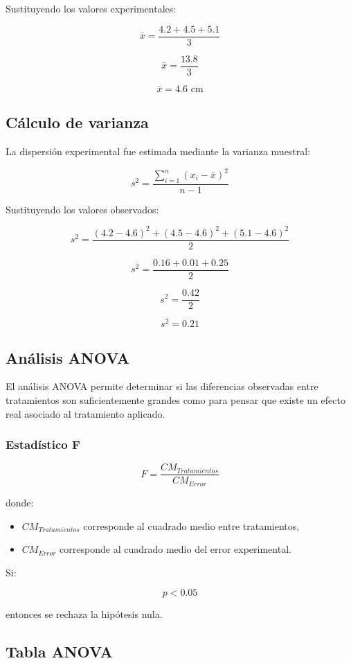 Sustituyendo los valores experimentales:

\[
\bar{x}=\frac{4.2+4.5+5.1}{3}
\]

\[
\bar{x}=\frac{13.8}{3}
\]

\[
\bar{x}=4.6\text{ cm}
\]

\subsection{Cálculo de varianza}

La dispersión experimental fue estimada mediante la varianza muestral:

\[
s^2=\frac{\sum_{i=1}^{n}(x_i-\bar{x})^2}{n-1}
\]

Sustituyendo los valores observados:

\[
s^2=\frac{
(4.2-4.6)^2+
(4.5-4.6)^2+
(5.1-4.6)^2
}{2}
\]

\[
s^2=
\frac{
0.16+0.01+0.25
}{2}
\]

\[
s^2=
\frac{0.42}{2}
\]

\[
s^2=0.21
\]

\subsection{Análisis ANOVA}

El análisis ANOVA permite determinar si las diferencias observadas entre tratamientos son suficientemente grandes como para pensar que existe un efecto real asociado al tratamiento aplicado.

\subsubsection{Estadístico F}

\[
F=\frac{CM_{Tratamientos}}{CM_{Error}}
\]

donde:

\begin{itemize}
    \item $CM_{Tratamientos}$ corresponde al cuadrado medio entre tratamientos,
    \item $CM_{Error}$ corresponde al cuadrado medio del error experimental.
\end{itemize}

Si:

\[
p<0.05
\]

entonces se rechaza la hipótesis nula.

\subsection{Tabla ANOVA}

